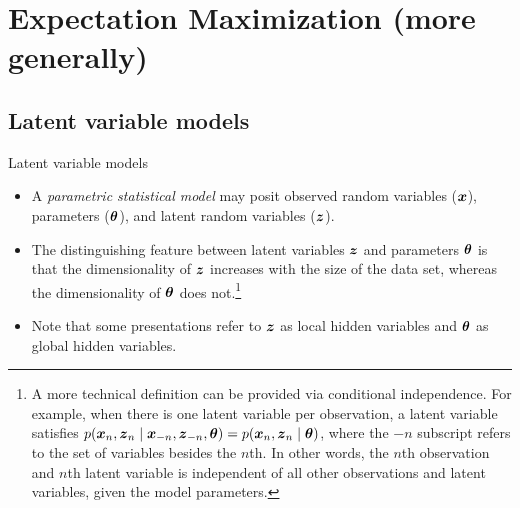 \documentclass[10pt]{beamer}
\begin{document}
\section{Expectation Maximization (more generally)}





\subsection{Latent variable models}
\begin{frame}{Latent variable models}

\begin{itemize}
\item A \textit{parametric statistical model} may posit observed random variables (${\boldsymbol x}$), parameters (${\boldsymbol \theta}$), and latent random variables (${\boldsymbol z}$).   
\item The distinguishing feature between latent variables ${\boldsymbol z}$ and parameters ${\boldsymbol \theta}$ is that the dimensionality of ${\boldsymbol z}$ increases with the size of the data set, whereas the dimensionality of ${\boldsymbol \theta}$ does not.\footnote{A more technical definition can be provided via conditional independence.  For example, when there is one latent variable per observation, a latent variable satisfies $p({\boldsymbol x}_n,{\boldsymbol z}_n \; | \; {\boldsymbol x}_{-n}, {\boldsymbol z}_{-n}, {\boldsymbol \theta}) = p({\boldsymbol x}_n,{\boldsymbol z}_n \; | \; {\boldsymbol \theta})$, where the $-n$ subscript refers to the set of variables besides the $n$th. In other words, the $n$th observation and $n$th latent variable is independent of all other observations and latent variables, given the model parameters.}  
\item 
 Note that some presentations refer to ${\boldsymbol z}$ as local hidden variables and ${\boldsymbol \theta}$ as global hidden variables.
\end{itemize}

\end{frame}
\end{document}
